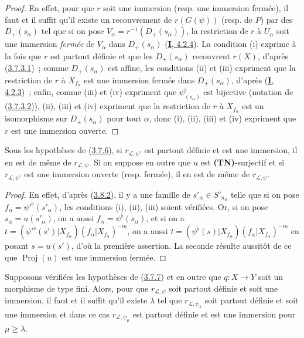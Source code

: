 \begin{proof}
En effet, pour que $r$ soit une immersion (resp. une immersion fermée), il
faut et il suffit qu'il existe un recouvrement de $r(G(\psi))$ (resp. de
$P$) par des $D_+(s_\alpha)$ tel que si on pose
$V_\alpha=r^{-1}(D_+(s_\alpha))$, la restriction de $r$ à $U_\alpha$ soit
une immersion \emph{fermée} de $V_\alpha$ dans $D_+(s_\alpha)$
(\hyperref[I.4.2.4-fr]{\textbf{I}, 4.2.4}). La condition (i) exprime à la fois que
$r$ est partout définie et que les $D_+(s_\alpha)$ recouvrent $r(X)$,
d'après (\hyperref[II.3.7.3.1-fr]{3.7.3.1})~; comme $D_+(s_\alpha)$ est
affine, les conditions (ii) et (iii) expriment que la restriction de $r$ à
$X_{f_\alpha}$ est une immersion fermée dans $D_+(s_\alpha)$, d'après
(\hyperref[I.4.2.3-fr]{\textbf{I}, 4.2.3})~; enfin, comme (iii) et (iv) expriment que
$\psi_{(s_\alpha)}^\flat$ est bijective (notation de
(\hyperref[II.3.7.3.2-fr]{3.7.3.2})), (ii), (iii) et (iv) expriment que la
restriction de $r$ à $X_{f_\alpha}$ est un isomorphisme sur
$D_+(s_\alpha)$ pour tout $\alpha$, donc (i), (ii), (iii) et (iv) expriment
que $r$ est une immersion ouverte.
\end{proof}

\begin{corollary}[3.8.3]
\label{II.3.8.3-fr}
Sous les hypothèses de \textup{(\hyperref[II.3.7.6-fr]{3.7.6})}, si
$r_{\mathcal{L},\psi'}$ est partout définie et est une immersion, il en est
de même de $r_{\mathcal{L},\psi}$. Si on suppose en outre que $u$ est
\textup{\textbf{(TN)}}-surjectif et si $r_{\mathcal{L},\psi'}$ est une immersion
ouverte \textup{(resp.} fermée\textup{)}, il en est de même de $r_{\mathcal{L},\psi}$.
\end{corollary}

\begin{proof}
En effet, d'après (\hyperref[II.3.8.2-fr]{3.8.2}), il y a une famille de
$s'_\alpha\in S'_{n_\alpha}$ telle que si on pose
$f_\alpha=\psi'^\flat(s'_\alpha)$, les conditions (i), (ii), (iii) soient
vérifiées. Or, si on pose $s_\alpha=u(s'_\alpha)$, on a aussi
$f_\alpha=\psi^\flat(s_\alpha)$, et si on a
$t=(\psi'^\flat(s')|X_{f_\alpha})(f_\alpha|X_{f_\alpha})^{-m}$, on a aussi
$t=(\psi^\flat(s)|X_{f_\alpha})(f_\alpha|X_{f_\alpha})^{-m}$ en posant
$s=u(s')$, d'où la première assertion. La seconde résulte aussitôt de ce que
$\operatorname{Proj}(u)$ est une immersion fermée.
\end{proof}

\begin{proposition}[3.8.4]
\label{II.3.8.4-fr}
Supposons vérifiées les hypothèses de
\textup{(\hyperref[II.3.7.7-fr]{3.7.7})} et en outre que $q:X\to Y$ soit un morphisme
de type fini. Alors, pour que $r_{\mathcal{L},\psi}$ soit partout définie et
soit une immersion, il faut et il suffit qu'il existe $\lambda$ tel que
$r_{\mathcal{L},\psi_\lambda}$ soit partout définie et soit une immersion et
dans ce cas $r_{\mathcal{L},\psi_\mu}$ est partout définie et est une
immersion pour $\mu\geq\lambda$.
\end{proposition}

